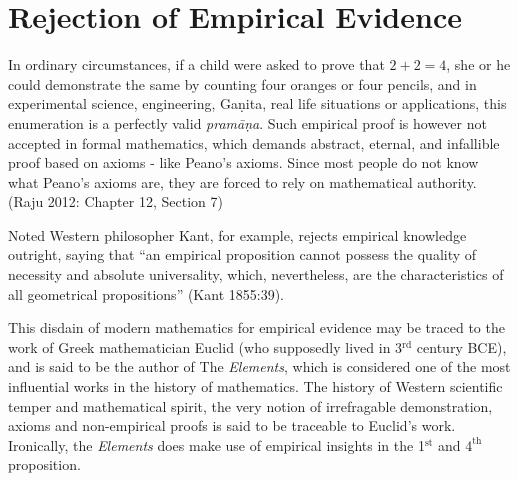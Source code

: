 \section*{Rejection of Empirical Evidence}

In ordinary circumstances, if a child were asked to prove that $2 + 2 = 4$, she or he could demonstrate the same by counting four oranges or four pencils, and in experimental science, engineering, Gaṇita, real life situations or applications, this enumeration is a perfectly valid {\sl pramāṇa}. Such empirical proof is however not accepted in formal mathematics, which demands abstract, eternal, and infallible proof based on axioms - like Peano’s axioms. Since most people do not know what Peano’s axioms are, they are forced to rely on mathematical authority.
 (Raju 2012: Chapter 12, Section 7)

Noted Western philosopher Kant, for example, rejects empirical knowledge outright, saying that ``an empirical proposition cannot possess the quality of necessity and absolute universality, which, nevertheless, are the characteristics of all geometrical propositions'' (Kant 1855:39). 

This disdain of modern mathematics for empirical evidence may be traced to the work of Greek mathematician Euclid (who supposedly lived in 3$^{\text{rd}}$ century BCE), and is said to be the author of The {\sl Elements}, which is considered one of the most influential works in the history of mathematics. The history of Western scientific temper and mathematical spirit, the very notion of irrefragable demonstration, axioms and non-empirical proofs is said to be traceable to Euclid’s work. Ironically, the {\sl Elements} does make use of empirical insights in the  1$^{\text{st}}$ and $4^{\text{th}}$ proposition.

